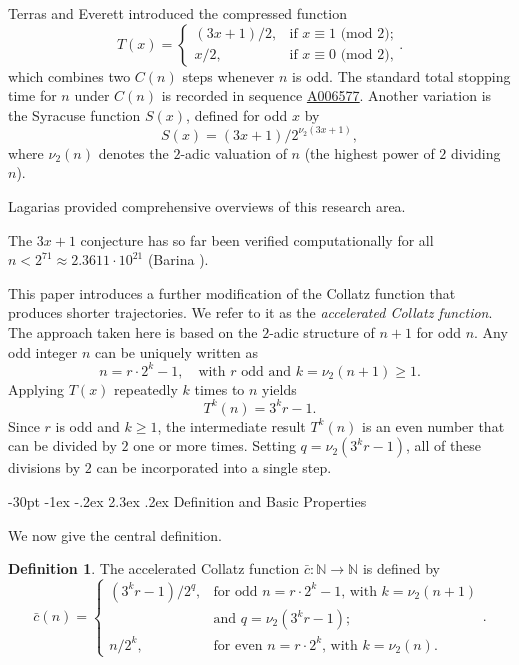 \documentclass[11pt]{article}
\makeatletter
\renewcommand\section{\@startsection {section}{1}{\z@}
{-30pt \@plus -1ex \@minus -.2ex}
{2.3ex \@plus.2ex}
{\normalfont\normalsize\bfseries\boldmath}}
\theoremstyle{plain}
\theoremstyle{definition}
\newtheorem{definition}{Definition}
\theoremstyle{remark}
\newcommand{\seqnum}[1]{\href{https://oeis.org/#1}{\rm \underline{#1}}}
\makeatother
\begin{document}
Terras \cite{Ter76} and Everett \cite{Ev77} introduced the compressed function
\begin{displaymath}
T(x) = \begin{cases}
(3x+1)/2, & \text{if $x \equiv 1$ (mod $2$);}\\
x/2, & \text{if $x \equiv 0$ (mod $2$),}
\end{cases}.
\end{displaymath}
which combines two $C(n)$ steps whenever $n$ is odd. The standard total stopping time for $n$ under $C(n)$ is recorded in sequence \seqnum{A006577}. Another variation is the Syracuse function $S(x)$, defined for odd $x$ by
\begin{displaymath}
S(x) = (3x+1)/2^{\nu_2(3x+1)} ,
\end{displaymath}
where $\nu_2(n)$ denotes the $2$-adic valuation of $n$ (the highest power of $2$ dividing $n$). \par
Lagarias \cite{Lag-B1, Lag-B2, Lag10} provided comprehensive overviews of this research area. \par
The {\em $3x+1$} conjecture has so far been verified computationally for all 
$n < 2^{71} \approx 2.3611 \cdot 10^{21}$
(Barina \cite{Bar25}).\par
 
This paper introduces a further modification of the Collatz function that produces shorter trajectories. 
We refer to it as the { \em accelerated Collatz function}.
The approach taken here is based on the $2$-adic structure of $n+1$ for odd $n$.
Any odd integer $n$ can be uniquely written as 
\begin{displaymath}
n = r \cdot 2^k - 1, \quad \text{with $r$ odd and $k = \nu_2(n+1) \ge 1$.}
\end{displaymath}
Applying $T(x)$ repeatedly $k$ times to $n$ yields
\begin{displaymath}
T^k(n) = 3^k r - 1.
\end{displaymath}
Since $r$ is odd and $k \ge 1$, the intermediate result $T^k(n)$ is an even number that can be divided by $2$ one or more times. 
Setting $q = \nu_2(3^k r - 1)$, all of these divisions by $2$ can be incorporated into a single step.

\section{Definition and Basic Properties}

We now give the central definition.
\begin{definition}
The accelerated Collatz function $\bar{c}: \mathbb{N} \to \mathbb{N}$ is defined by
\begin{displaymath}
\bar{c}(n) = \begin{cases}(3^k r - 1)/2^q, & \text{for odd $n = r \cdot 2^k - 1$, with $k = \nu_2(n+1)$}\\
& \text{and $q = \nu_2(3^k r - 1)$;}\\
 n/2^k, & \text{for even $n = r \cdot 2^k$, with $k = \nu_2(n)$.}
\end{cases}.
\end{displaymath}
\end{definition}
\end{document}
